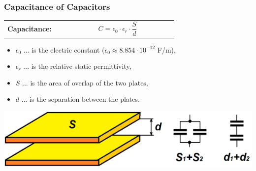 \documentclass{beamer}
\begin{document}
	\begin{frame}
    \frametitle{Capacitance of Capacitors}
		\begin{tabular}{p{0.3\linewidth} p{0.6\linewidth}}
		\textbf{Capacitance:} & $$C= \epsilon_0 \cdot \epsilon_r \cdot \frac{S}{d}$$
		\end{tabular}
		
		\begin{itemize}
			\item $\epsilon_0$ ... is the electric constant ($\epsilon_0\approx 8.854 \cdot 10^{-12}$ F/m),
			\item $\epsilon_r$ ... is the relative static permittivity,
			\item $S$ ... is the area of overlap of the two plates,
			\item $d$ ... is the separation between the plates.
		\end{itemize}
		\begin{center}
			\includegraphics[scale=0.3]{obr01_kapacita.png}
		\end{center}
  \end{frame}
\end{document}

